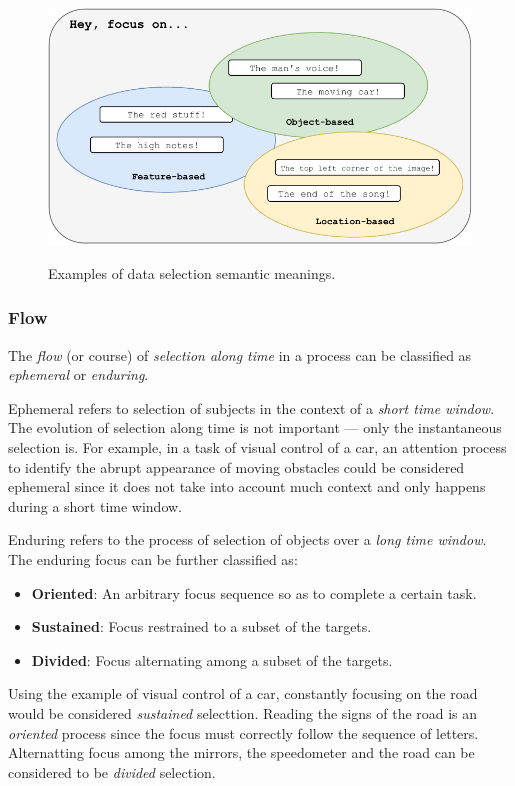 \documentclass[11pt]{article}
\begin{document}
\begin{figure}[H]
    \centering
    \includegraphics[width=0.8\linewidth]{./img/dataselsem.pdf}\label{fig:dataselsem}
    \caption{Examples of data selection semantic meanings.}
\end{figure}

\subsubsection{Flow}\label{sec:attrs-flow}
The \emph{flow} (or course) of \emph{selection along time} in a process
can be classified as \emph{ephemeral} or \emph{enduring}.

Ephemeral refers to selection of subjects in the context of a \emph{short time window}.
The evolution of selection along time is not important --- only the instantaneous selection is.
For example, in a task of visual control of a car,
an attention process to identify the abrupt appearance of moving obstacles
could be considered ephemeral since it does not take into account
much context and only happens during a short time window.

Enduring refers to the process of selection of objects over a \emph{long time window}.
The enduring focus can be further classified as:
\begin{itemize}
    \item \textbf{Oriented}: An arbitrary focus sequence so as to complete a certain task.
    \item \textbf{Sustained}: Focus restrained to a subset of the targets.
    \item \textbf{Divided}: Focus alternating among a subset of the targets.
\end{itemize}
Using the example of visual control of a car,
constantly focusing on the road would be considered \emph{sustained} selecttion.
Reading the signs of the road is an \emph{oriented} process since the focus must correctly follow the sequence of letters.
Alternatting focus among the mirrors, the speedometer and the road can be considered to be \emph{divided} selection.
\end{document}
